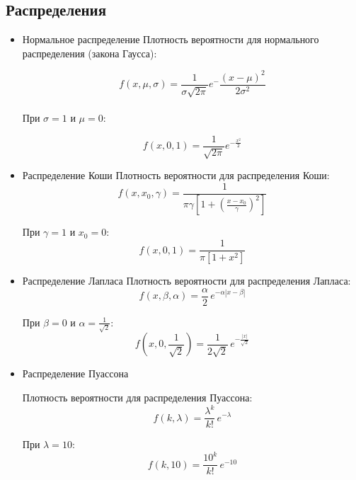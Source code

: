 \subsection{Распределения}
\begin{itemize}
\item{Нормальное распределение}
Плотность вероятности для нормального распределения (закона Гаусса):

\begin{equation}
  f(x, \mu, \sigma) = \frac{1}{{\sigma \sqrt {2\pi } }}e^-\frac{ \left( {x - \mu } \right)^2 } {2\sigma ^2 }
\end{equation}
 \\

При \( \sigma = 1 \) и \( \mu = 0 \):

\begin{equation}
  f(x, 0, 1) = \frac{1}{ \sqrt {2\pi } }e^{-\frac{{x}^2 }{2}}
\end{equation}


\item{Распределение Коши}
Плотность вероятности для распределения Коши:
$$
f(x, {x_0}, \gamma) =  \frac{1}{\pi\gamma \left[1 + \left(\frac{x-x_0}{\gamma}\right)^2\right]}
$$

При \( \gamma = 1 \) и \( x_0 = 0 \):
$$
f(x, 0, 1) =  \frac{1}{\pi \left[1 + {x}^2\right]}
$$


\item{Распределение Лапласа}
Плотность вероятности для распределения Лапласа:
\begin{equation} 
f(x, \beta, \alpha) = \frac{\alpha}{2} \, e^{-\alpha|x - \beta|}
\end{equation}

При \( \beta = 0 \) и \( \alpha = \frac{1}{\sqrt{2}} \):
\begin{equation} 
f(x, 0, \frac{1}{\sqrt{2}}) = \frac{1}{2\sqrt{2}} \, e^{-\frac{|x|}{\sqrt{2}}}
\end{equation}


\item{Распределение Пуассона}

Плотность вероятности для распределения Пуассона:
\begin{equation} 
f(k, \lambda) = \frac{\lambda^k}{k!}\, e^{-\lambda}
\end{equation}

При \( \lambda = 10 \):
\begin{equation} 
f(k, 10) = \frac{10^k}{k!}\, e^{-10}
\end{equation}


\end{itemize}
